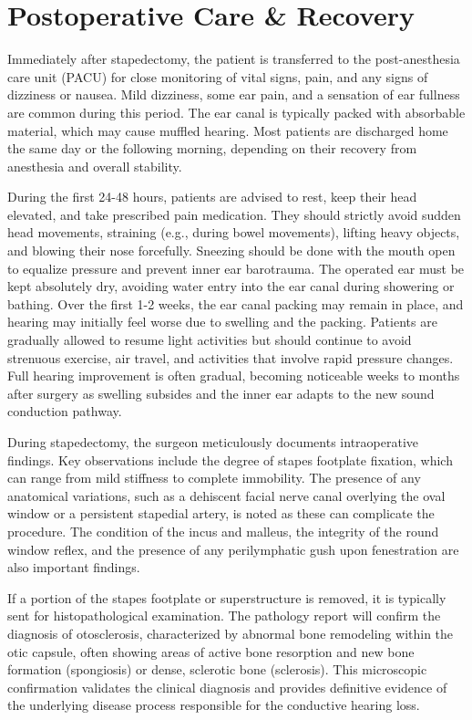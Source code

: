 \section*{Postoperative Care \& Recovery}
Immediately after stapedectomy, the patient is transferred to the post-anesthesia care unit (PACU) for close monitoring of vital signs, pain, and any signs of dizziness or nausea. Mild dizziness, some ear pain, and a sensation of ear fullness are common during this period. The ear canal is typically packed with absorbable material, which may cause muffled hearing. Most patients are discharged home the same day or the following morning, depending on their recovery from anesthesia and overall stability.

During the first 24-48 hours, patients are advised to rest, keep their head elevated, and take prescribed pain medication. They should strictly avoid sudden head movements, straining (e.g., during bowel movements), lifting heavy objects, and blowing their nose forcefully. Sneezing should be done with the mouth open to equalize pressure and prevent inner ear barotrauma. The operated ear must be kept absolutely dry, avoiding water entry into the ear canal during showering or bathing. Over the first 1-2 weeks, the ear canal packing may remain in place, and hearing may initially feel worse due to swelling and the packing. Patients are gradually allowed to resume light activities but should continue to avoid strenuous exercise, air travel, and activities that involve rapid pressure changes. Full hearing improvement is often gradual, becoming noticeable weeks to months after surgery as swelling subsides and the inner ear adapts to the new sound conduction pathway.

During stapedectomy, the surgeon meticulously documents intraoperative findings. Key observations include the degree of stapes footplate fixation, which can range from mild stiffness to complete immobility. The presence of any anatomical variations, such as a dehiscent facial nerve canal overlying the oval window or a persistent stapedial artery, is noted as these can complicate the procedure. The condition of the incus and malleus, the integrity of the round window reflex, and the presence of any perilymphatic gush upon fenestration are also important findings.

If a portion of the stapes footplate or superstructure is removed, it is typically sent for histopathological examination. The pathology report will confirm the diagnosis of otosclerosis, characterized by abnormal bone remodeling within the otic capsule, often showing areas of active bone resorption and new bone formation (spongiosis) or dense, sclerotic bone (sclerosis). This microscopic confirmation validates the clinical diagnosis and provides definitive evidence of the underlying disease process responsible for the conductive hearing loss.


